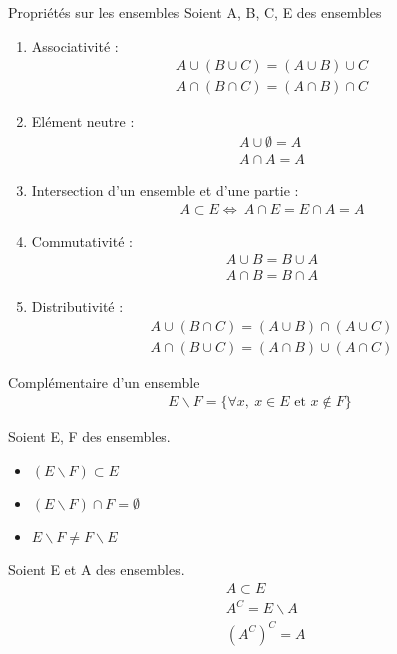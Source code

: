 \begin{proposition}{Propriétés sur les ensembles} Soient A, B, C, E des ensembles
	\begin{enumerate}
		\item Associativité :
		\begin{align*}
			A \cup (B \cup C) = (A \cup B) \cup C \\
			A \cap (B \cap C) = (A \cap B) \cap C
		\end{align*}
		\item Elément neutre : 
		\begin{align*}
			A \cup \emptyset = A \\
            A \cap A = A
		\end{align*}
		\item Intersection d'un ensemble et d'une partie :
		\begin{align*}
			A \subset E \iff \ A \cap E = E \cap A = A
		\end{align*}
		\item Commutativité :
		\begin{align*}
			A \cup B = B \cup A \\
			A \cap B = B \cap A
		\end{align*}
		\item Distributivité :
		\begin{align*}
			A \cup (B \cap C) = (A \cup B) \cap (A \cup C) \\
			A \cap (B \cup C) = (A \cap B) \cup (A \cap C)
		\end{align*}
	\end{enumerate}
\end{proposition}

\begin{definition}{Complémentaire d'un ensemble}
	\begin{align*}
		E \backslash F = \{\forall x,\ x \in E \text{ et } x \notin F \}
	\end{align*}
\end{definition}
\begin{remarque}Soient E, F des ensembles.
	\begin{itemize}
		\item $(E \backslash F) \subset E$
		\item $(E \backslash F) \cap F = \emptyset$
		\item $E \backslash F \neq F \backslash E$
	\end{itemize}
\end{remarque}
\begin{remarque}Soient E et A des ensembles.
	\begin{align*}
		&A \subset E \\
		&A^C = E \backslash A \\
		&(A^C)^C = A
	\end{align*}
\end{remarque}

